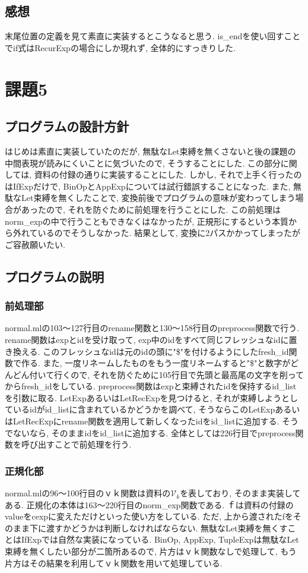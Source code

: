 \documentclass{jarticle}
\begin{document}
\subsection{感想}
末尾位置の定義を見て素直に実装するとこうなると思う. is\_endを使い回すことでif式はRecurExpの場合にしか現れず, 全体的にすっきりした.


\section{課題5}
\subsection{プログラムの設計方針}
はじめは素直に実装していたのだが, 無駄なLet束縛を無くさないと後の課題の中間表現が読みにくいことに気づいたので, そうすることにした. この部分に関しては, 資料の付録の通りに実装することにした. しかし, それで上手く行ったのはIfExpだけで, BinOpとAppExpについては試行錯誤することになった. また, 無駄なLet束縛を無くしたことで, 変換前後でプログラムの意味が変わってしまう場合があったので, それを防ぐために前処理を行うことにした. この前処理はnorm\_expの中で行うこともできなくはなかったが, 正規形にするという本質から外れているのでそうしなかった. 結果として, 変換に2パスかかってしまったがご容赦願いたい.

\subsection{プログラムの説明}
\subsubsection{前処理部}
normal.mlの103〜127行目のrename関数と130〜158行目のpreprocess関数で行う. rename関数はexpとidを受け取って, exp中のidをすべて同じフレッシュなidに置き換える. このフレッシュなidは元のidの頭に"\$"を付けるようにしたfresh\_id関数で作る. また, 一度リネームしたものをもう一度リネームすると"\$"と数字がどんどん付いて行くので, それを防ぐために105行目で先頭と最高尾の文字を削ってからfresh\_idをしている. preprocess関数はexpと束縛されたidを保持するid\_listを引数に取る. LetExpあるいはLetRecExpを見つけると, それが束縛しようとしているidがid\_listに含まれているかどうかを調べて, そうならこのLetExpあるいはLetRecExpにrename関数を適用して新しくなったidをid\_listに追加する. そうでないなら, そのままidをid\_listに追加する. 全体としては226行目でpreprocess関数を呼び出すことで前処理を行う.

\subsubsection{正規化部}
normal.mlの96〜100行目のｖｋ関数は資料の$\mathcal{V}_k$を表しており, そのまま実装してある. 正規化の本体は163〜220行目のnorm\_exp関数である. ｆは資料の付録のvalueをcexpに変えただけといった使い方をしている. ただ, 上から渡されたfをそのまま下に渡すかどうかは判断しなければならない. 無駄なLet束縛を無くすことはIfExpでは自然な実装になっている. BinOp, AppExp, TupleExpは無駄なLet束縛を無くしたい部分が二箇所あるので, 片方はｖｋ関数なしで処理して, もう片方はその結果を利用してｖｋ関数を用いて処理している. 
\end{document}
